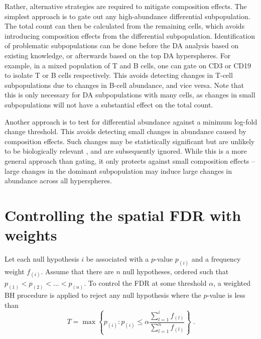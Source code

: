 \documentclass{article}
\begin{document}
Rather, alternative strategies are required to mitigate composition effects.
The simplest approach is to gate out any high-abundance differential subpopulation.
The total count can then be calculated from the remaining cells, which avoids introducing composition effects from the differential subpopulation.
Identification of problematic subpopulations can be done before the DA analysis based on existing knowledge, or afterwards based on the top DA hyperspheres.
For example, in a mixed population of T and B cells, one can gate on CD3 or CD19 to isolate T or B cells respectively.
This avoids detecting changes in T-cell subpopulations due to changes in B-cell abundance, and vice versa.
Note that this is only necessary for DA subpopulations with many cells, as changes in small subpopulations will not have a substantial effect on the total count.

Another approach is to test for differential abundance against a minimum log-fold change threshold.
This avoids detecting small changes in abundance caused by composition effects.
Such changes may be statistically significant but are unlikely to be biologically relevant \cite{mccarthy2009treat}, and are subsequently ignored.
While this is a more general approach than gating, it only protects against small composition effects -- large changes in the dominant subpopulation may induce large changes in abundance across all hyperspheres.

\section{Controlling the spatial FDR with weights}
Let each null hypothesis $i$ be associated with a $p$-value $p_{(i)}$ and a frequency weight $f_{(i)}$.
Assume that there are $n$ null hypotheses, ordered such that $p_{(1)} < p_{(2)} < ... < p_{(n)}$.
To control the FDR at some threshold $\alpha$, a weighted BH procedure is applied \cite{benjamini1997multiple} to reject any null hypothesis where the $p$-value is less than
\[
    T = \max\left\{ p_{(i)} : p_{(i)} \le \alpha \frac{\sum_{l=1}^{i} f_{(l)}}{\sum_{l=1}^{n} f_{(l)}} \right\}  \;.
\]
\end{document}
